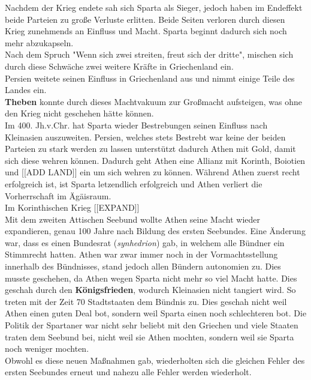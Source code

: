 \documentclass{article}
\begin{document}
	Nachdem der Krieg endete sah sich Sparta als Sieger, jedoch haben im Endeffekt beide Parteien zu große Verluste erlitten. Beide Seiten verloren durch diesen Krieg zunehmends an Einfluss und Macht. Sparta beginnt dadurch sich noch mehr abzukapseln. \\
	Nach dem Spruch "Wenn sich zwei streiten, freut sich der dritte", mischen sich durch diese Schwäche zwei weitere Kräfte in Griechenland ein. \\
	Persien weitete seinen Einfluss in Griechenland aus und nimmt einige Teile des Landes ein. \\
	\textbf{Theben} konnte durch dieses Machtvakuum zur Großmacht aufsteigen, was ohne den Krieg nicht geschehen hätte können. \\
	Im 400. Jh.v.Chr. hat Sparta wieder Bestrebungen seinen Einfluss nach Kleinasien auszuweiten. Persien, welches stets Bestrebt war keine der beiden Parteien zu stark werden zu lassen unterstützt dadurch Athen mit Gold, damit sich diese wehren können. Dadurch geht Athen eine Allianz mit Korinth, Boiotien und [[ADD LAND]] ein um sich wehren zu können. Während Athen zuerst recht erfolgreich ist, ist Sparta letzendlich erfolgreich und Athen verliert die Vorherrschaft im Ägäisraum. \\
	Im Korinthischen Krieg [[EXPAND]] \\
	Mit dem zweiten Attischen Seebund wollte Athen seine Macht wieder expandieren, genau 100 Jahre nach Bildung des ersten Seebundes. Eine Änderung war, dass es einen Bundesrat (\textit{synhedrion}) gab, in welchem alle Bündner ein Stimmrecht hatten. Athen war zwar immer noch in der Vormachtsstellung innerhalb des Bündnisses, stand jedoch allen Bündern autonomien zu. Dies musste geschehen, da Athen wegen Sparta nicht mehr so viel Macht hatte. Dies geschah durch den \textbf{Königsfrieden}, wodurch Kleinasien nicht tangiert wird. So treten mit der Zeit 70 Stadtstaaten dem Bündnis zu. Dies geschah nicht weil Athen einen guten Deal bot, sondern weil Sparta einen noch schlechteren bot. Die Politik der Spartaner war nicht sehr beliebt mit den Griechen und viele Staaten traten dem Seebund bei, nicht weil sie Athen mochten, sondern weil sie Sparta noch weniger mochten. \\
	Obwohl es diese neuen Maßnahmen gab, wiederholten sich die gleichen Fehler des ersten Seebundes erneut und nahezu alle Fehler werden wiederholt. \\
\end{document}
